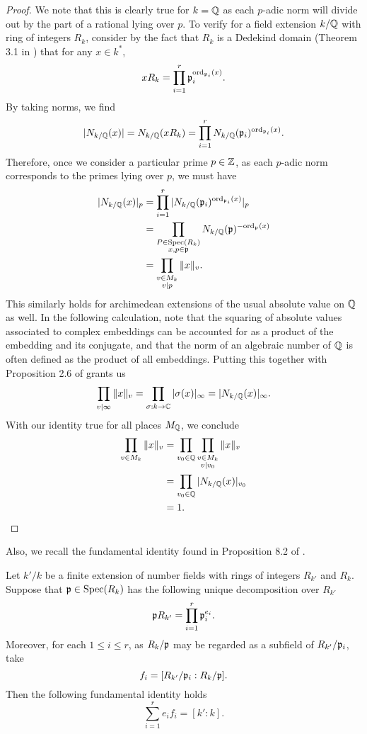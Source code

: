 \begin{proof}
    We note that this is clearly true for $k = \mathbb{Q}$ as each $p$-adic norm will divide out by the part of a rational lying over $p$.
    To verify for a field extension $k/\mathbb{Q}$ with ring of integers $R_k$,
    consider by the fact that $R_k$ is a Dedekind domain (Theorem 3.1 in \cite{Neukirch_2013}) that for any $x \in k^*$,
    \[
        xR_k = \prod_{i = 1}^r \mathfrak{p}_i^{{\rm ord}_{\mathfrak{p}_i}(x)}.
    \]
    By taking norms, we find
    \[
        |N_{k/\mathbb{Q}}(x)| = N_{k / \mathbb{Q}}(xR_k) = \prod_{i = 1}^r N_{k / \mathbb{Q}}(\mathfrak{p}_i)^{{\rm ord}_{\mathfrak{p}_i}(x)}.
    \]
    Therefore, once we consider a particular prime $p \in \mathbb{Z}$,
    as each $p$-adic norm corresponds to the primes lying over $p$,
    we must have
    \begin{align*}
        |N_{k/\mathbb{Q}}(x)|_p 
        & = \prod_{i = 1}^r |N_{k / \mathbb{Q}}(\mathfrak{p}_i)^{{\rm ord}_{\mathfrak{p}_i}(x)}|_p \\
        & = \prod_{\substack{P \in {\rm Spec}(R_k) \\ x, p \in \mathfrak{p}}} N_{k / \mathbb{Q}}(\mathfrak{p})^{-{\rm ord}_{\mathfrak{p}}(x)} \\
        & = \prod_{\substack{v \in M_k \\ v | p}} \|x\|_v.
    \end{align*}
    This similarly holds for archimedean extensions of the usual absolute value on $\mathbb{Q}$ as well.
    In the following calculation, 
    note that the squaring of absolute values associated to complex embeddings can be accounted for as a product of the embedding and its conjugate,
    and that the norm of an algebraic number of $\mathbb{Q}$ is often defined as the product of all embeddings.
    Putting this together with Proposition 2.6 of \cite{Neukirch_2013} grants us
    \[
        \prod_{v | \infty} \|x\|_v 
        = \prod_{\sigma : k \to \mathbb{C}} |\sigma(x)|_\infty
        = |N_{k/\mathbb{Q}}(x)|_\infty.  
    \]
    With our identity true for all places $M_{\mathbb{Q}}$, we conclude
    \begin{align*}
        \prod_{v \in M_k} \|x\|_v
        & =  \prod_{v_0 \in \mathbb{Q}} \prod_{\substack{v \in M_k \\ v | v_0}} \|x\|_v \\
        & = \prod_{v_0 \in \mathbb{Q}} |N_{k/\mathbb{Q}}(x)|_{v_0} \\
        & = 1.
    \end{align*}
\end{proof}

Also, we recall the fundamental identity found in Proposition 8.2 of \cite{Neukirch_2013}.

\begin{lemma}
    Let $k'/k$ be a finite extension of number fields with rings of integers $R_{k'}$ and $R_k$.
    Suppose that $\mathfrak{p} \in {\rm Spec}(R_k)$ has the following unique decomposition over $R_{k'}$
    \[
        \mathfrak{p} R_{k'} = \prod_{i = 1}^r \mathfrak{p}_i^{e_i}.
    \]
    Moreover, for each $1 \leq i \leq r$, 
    as $R_k/\mathfrak{p}$ may be regarded as a subfield of $R_{k'} / \mathfrak{p}_i$,
    take
    \[
        f_i = [R_{k'} / \mathfrak{p}_i : R_k / \mathfrak{p}].
    \]
    Then the following fundamental identity holds
    \[
        \sum_{i = 1}^r e_i f_i = [k' : k].
    \]
\end{lemma}

